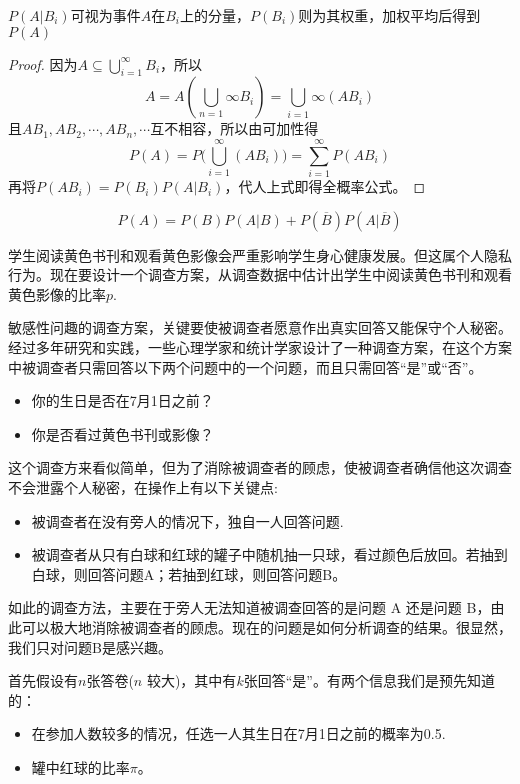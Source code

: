 \begin{note}
    $P(A | B_i)$可视为事件$A$在$B_i$上的分量，$P(B_i)$则为其权重，加权平均后得到$P(A)$
\end{note}

\begin{proof}
    因为$A \subseteq \bigcup_{i=1}^{\infty} B_i$，所以
    \[ A = A (\bigcup_{n=1}{\infty} B_i) = \bigcup_{i=1}{\infty} (A B_i) \]
    且$AB_1, AB_2, \cdots, AB_n, \cdots $互不相容，所以由可加性得
    \[ P(A) = P \biggl( \bigcup_{i=1}^{\infty} (AB_i) \biggr) = \sum_{i=1}^{\infty} P (AB_i) \]
    再将$P(AB_i) = P(B_i) P(A|B_i)$，代人上式即得全概率公式。
\end{proof}

\begin{corollary}
    \[ P(A) = P(B) P(A|B) + P(\overline{B}) P(A|\overline{B}) \]
\end{corollary}

\begin{example}[敏感性问题调查]
    学生阅读黄色书刊和观看黄色影像会严重影响学生身心健康发展。但这属个人隐私行为。现在要设计一个调查方案，从调查数据中估计出学生中阅读黄色书刊和观看黄色影像的比率$p$.
\end{example}

敏感性问趣的调查方案，关键要使被调查者愿意作出真实回答又能保守个人秘密。经过多年研究和实践，一些心理学家和统计学家设计了一种调查方案，在这个方案中被调查者只需回答以下两个问题中的一个问题，而且只需回答“是”或“否”。
\begin{itemize}
    \item 你的生日是否在7月1日之前？
    \item 你是否看过黄色书刊或影像？
\end{itemize}

这个调查方来看似简单，但为了消除被调查者的顾虑，使被调查者确信他这次调查不会泄露个人秘密，在操作上有以下关键点:
\begin{itemize}
    \item 被调查者在没有旁人的情况下，独自一人回答问题.
    \item 被调查者从只有白球和红球的罐子中随机抽一只球，看过颜色后放回。若抽到白球，则回答问题A；若抽到红球，则回答问题B。
\end{itemize}
如此的调查方法，主要在于旁人无法知道被调查回答的是问题 A 还是问题 B，由此可以极大地消除被调查者的顾虑。现在的问题是如何分析调查的结果。很显然，我们只对问题B是感兴趣。

首先假设有$n$张答卷($n$ 较大)，其中有$k$张回答“是”。有两个信息我们是预先知道的：
\begin{itemize}
    \item 在参加人数较多的情况，任选一人其生日在7月1日之前的概率为0.5.
    \item 罐中红球的比率$\pi$。
\end{itemize}

